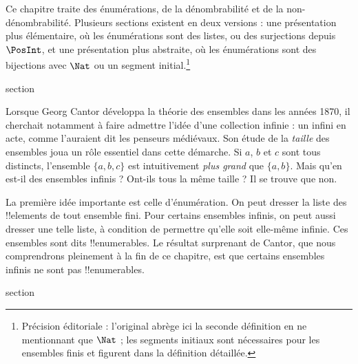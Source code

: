 \documentclass[11pt,a4paper,openany]{memoir}
\begin{document}

\begin{editorial}
Ce chapitre traite des énumérations, de la dénombrabilité et de la
non-dénombrabilité. Plusieurs sections existent en deux versions :
une présentation plus élémentaire, où les énumérations sont des
listes, ou des surjections depuis $\PosInt$, et une présentation
plus abstraite, où les énumérations sont des bijections avec
$\Nat$ ou un segment initial.\footnote{Précision éditoriale :
l'original abrège ici la seconde définition en ne mentionnant que
$\Nat$ ; les segments initiaux sont nécessaires pour les ensembles
finis et figurent dans la définition détaillée.}
\end{editorial}


\begingroup
\expandafter\def\csname ol@sectioncs\endcsname{section}
\def\olfilename{introduction}




Lorsque Georg Cantor développa la théorie des ensembles dans les années
1870, il cherchait notamment à faire admettre l’idée d’une collection
infinie : un infini en acte, comme l’auraient dit les penseurs médiévaux.
Son étude de la \emph{taille} des ensembles joua un rôle essentiel
dans cette démarche. Si $a$, $b$ et $c$ sont tous distincts, l’ensemble
$\{a, b, c\}$ est intuitivement \emph{plus grand} que $\{a, b\}$.
Mais qu’en est-il des ensembles infinis ? Ont-ils tous la même taille ?
Il se trouve que non.

La première idée importante est celle d’énumération. On peut dresser
la liste des !!{element}s de tout ensemble fini. Pour certains ensembles
infinis, on peut aussi dresser une telle liste, à condition de permettre
qu’elle soit elle-même infinie. Ces ensembles sont dits !!{enumerable}s.
Le résultat surprenant de Cantor, que nous comprendrons pleinement
à la fin de ce chapitre, est que certains ensembles infinis ne sont pas
!!{enumerable}s.


\endgroup



\begingroup
\expandafter\def\csname ol@sectioncs\endcsname{section}
\def\olfilename{enumerability}
\end{document}
